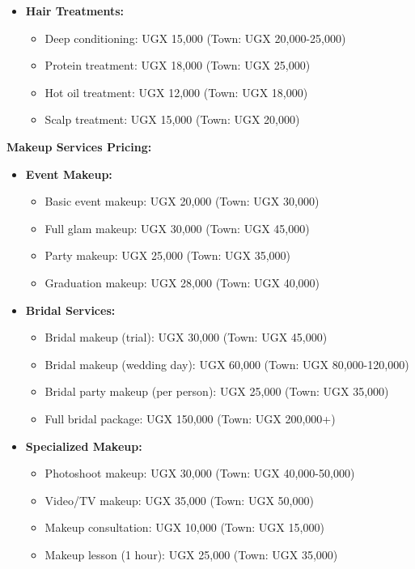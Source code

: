 \documentclass[a4paper,12pt]{article}
\begin{document}
\begin{itemize}[leftmargin=2em]
    \item \textbf{Hair Treatments:}
    \begin{itemize}
        \item Deep conditioning: UGX 15,000 (Town: UGX 20,000-25,000)
        \item Protein treatment: UGX 18,000 (Town: UGX 25,000)
        \item Hot oil treatment: UGX 12,000 (Town: UGX 18,000)
        \item Scalp treatment: UGX 15,000 (Town: UGX 20,000)
    \end{itemize}
\end{itemize}

\textbf{Makeup Services Pricing:}
\begin{itemize}[leftmargin=2em]
    \item \textbf{Event Makeup:}
    \begin{itemize}
        \item Basic event makeup: UGX 20,000 (Town: UGX 30,000)
        \item Full glam makeup: UGX 30,000 (Town: UGX 45,000)
        \item Party makeup: UGX 25,000 (Town: UGX 35,000)
        \item Graduation makeup: UGX 28,000 (Town: UGX 40,000)
    \end{itemize}
    
    \item \textbf{Bridal Services:}
    \begin{itemize}
        \item Bridal makeup (trial): UGX 30,000 (Town: UGX 45,000)
        \item Bridal makeup (wedding day): UGX 60,000 (Town: UGX 80,000-120,000)
        \item Bridal party makeup (per person): UGX 25,000 (Town: UGX 35,000)
        \item Full bridal package: UGX 150,000 (Town: UGX 200,000+)
    \end{itemize}
    
    \item \textbf{Specialized Makeup:}
    \begin{itemize}
        \item Photoshoot makeup: UGX 30,000 (Town: UGX 40,000-50,000)
        \item Video/TV makeup: UGX 35,000 (Town: UGX 50,000)
        \item Makeup consultation: UGX 10,000 (Town: UGX 15,000)
        \item Makeup lesson (1 hour): UGX 25,000 (Town: UGX 35,000)
    \end{itemize}
\end{itemize}
\end{document}
